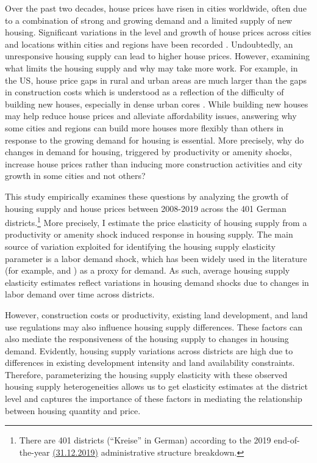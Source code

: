 \documentclass[
  12pt,
]{article}
\begin{document}
Over the past two decades, house prices have risen in cities worldwide, often due to a combination of strong and growing demand and a limited supply of new housing. Significant variations in the level and growth of house prices across cities and locations within cities and regions have been recorded \citep{glaeser2020, hilber-mensa2021}. Undoubtedly, an unresponsive housing supply can lead to higher house prices. However, examining what limits the housing supply and why may take more work. For example, in the US, house price gaps in rural and urban areas are much larger than the gaps in construction costs which is understood as a reflection of the difficulty of building new houses, especially in dense urban cores \citep{glaeser2020}. While building new houses may help reduce house prices and alleviate affordability issues, answering why some cities and regions can build more houses more flexibly than others in response to the growing demand for housing is essential. More precisely, why do changes in demand for housing, triggered by productivity or amenity shocks, increase house prices rather than inducing more construction activities and city growth in some cities and not others?

This study empirically examines these questions by analyzing the growth of housing supply and house prices between 2008-2019 across the 401 German districts.\footnote{There are 401 districts (``Kreise'' in German) according to the 2019 end-of-the-year \href{https://www.destatis.de/DE/Themen/Laender-Regionen/Regionales/Gemeindeverzeichnis/Administrativ/Archiv/Verwaltungsgliederung/31122019_Jahr.html}{(31.12.2019)} administrative structure breakdown.} More precisely, I estimate the price elasticity of housing supply from a productivity or amenity shock induced response in housing supply. The main source of variation exploited for identifying the housing supply elasticity parameter is a \citet{bartik1991} labor demand shock, which has been widely used in the literature (for example, \citet{saiz2010} and \citet{baumsnow-han2019}) as a proxy for demand. As such, average housing supply elasticity estimates reflect variations in housing demand shocks due to changes in labor demand over time across districts.

However, construction costs or productivity, existing land development, and land use regulations may also influence housing supply differences. These factors can also mediate the responsiveness of the housing supply to changes in housing demand. Evidently, housing supply variations across districts are high due to differences in existing development intensity and land availability constraints. Therefore, parameterizing the housing supply elasticity with these observed housing supply heterogeneities allows us to get elasticity estimates at the district level and captures the importance of these factors in mediating the relationship between housing quantity and price.
\end{document}
